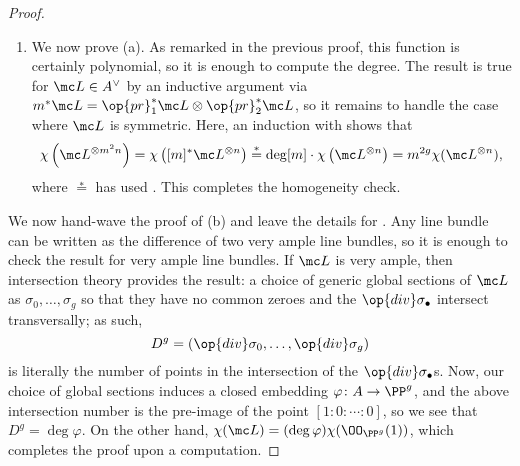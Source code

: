 \documentclass[../notes.tex]{subfiles}
\begin{document}
\begin{proof}
\begin{enumerate}
		\item We now prove (a). As remarked in the previous proof, this function is certainly polynomial, so it is enough to compute the degree. The result is true for $\mc L\in A^\lor$ by an inductive argument via $m^*\mc L=\op{pr}_1^*\mc L\otimes\op{pr}_2^*\mc L$, so it remains to handle the case where $\mc L$ is symmetric. Here, an induction with  shows that
		\[\chi\left(\mc L^{\otimes m^2n}\right)=\chi\left([m]^*\mc L^{\otimes n}\right)\stackrel*=\deg[m]\cdot\chi\left(\mc L^{\otimes n}\right)=m^{2g}\chi(\mc L^{\otimes n}),\]
		where $\stackrel*=$ has used . This completes the homogeneity check.
	\end{enumerate}
	We now hand-wave the proof of (b) and leave the details for \cite[Theorem~III.16]{mumford}. Any line bundle can be written as the difference of two very ample line bundles, so it is enough to check the result for very ample line bundles. If $\mc L$ is very ample, then intersection theory provides the result: a choice of generic global sections of $\mc L$ as $\sigma_0,\ldots,\sigma_g$ so that they have no common zeroes and the $\op{div}\sigma_\bullet$ intersect transversally; as such,
	\[D^g=(\op{div}\sigma_0,\ldots,\op{div}\sigma_g)\]
	is literally the number of points in the intersection of the $\op{div}\sigma_\bullet$s. Now, our choice of global sections induces a closed embedding $\varphi\colon A\to\PP^g$, and the above intersection number is the pre-image of the point $[1:0:\cdots:0]$, so we see that $D^g=\deg\varphi$. On the other hand, $\chi(\mc L)=(\deg\varphi)\chi(\OO_{\PP^g}(1))$, which completes the proof upon a computation.
\end{proof}
\end{document}
